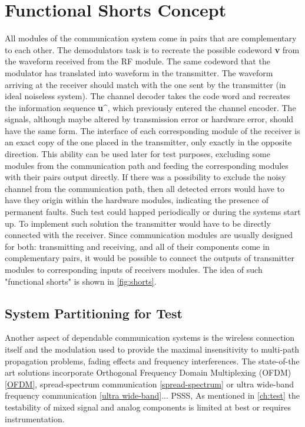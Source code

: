 \section{Functional Shorts Concept}
All modules of the communication system come in pairs that are complementary to each other. The demodulators task is to recreate the possible codeword \textbf{v} from the waveform received from the RF module. The same codeword that the modulator has translated into waveform in the transmitter. The waveform arriving at the receiver should match with the one sent by the transmitter (in ideal noiseless system). The channel decoder takes the code word and recreates the information sequence \textbf{u\^}, which previously entered the channel encoder. The signals, although maybe altered by transmission error or hardware error, should have the same form. The interface of each corresponding module of the receiver is an exact copy of the one placed in the transmitter, only exactly in the opposite direction. This ability can be used later for test purposes, excluding some modules from the communication path and feeding the corresponding modules with their pairs output directly.
If there was a possibility to exclude the noisy channel from the communication path, then all detected errors would have to have they origin within the hardware modules, indicating the presence of permanent faults. Such test could happed periodically or during the systems start up.
To implement such solution the transmitter would have to be directly connected with the receiver. Since communication modules are usually designed for both: transmitting and receiving, and all of their components come in complementary pairs, it would be possible to connect the outputs of transmitter modules to corresponding inputs of receivers modules. The idea of such "functional shorts" is shown in \autoref{fig:shorts}.
\subsection{System Partitioning for Test}
Another aspect of dependable communication systems is the wireless connection itself and the modulation used to provide the maximal insensitivity to multi-path propagation problems, fading effects and frequency interferences. The state-of-the art solutions incorporate Orthogonal Frequency Domain Multiplexing (OFDM) \ref{OFDM}, spread-spectrum communication \ref{spread-spectrum} or ultra wide-band frequency communication \ref{ultra wide-band}...
PSSS, 
 As mentioned in \autoref{ch:test} the testability of mixed signal and analog components is limited at best or requires instrumentation. 
